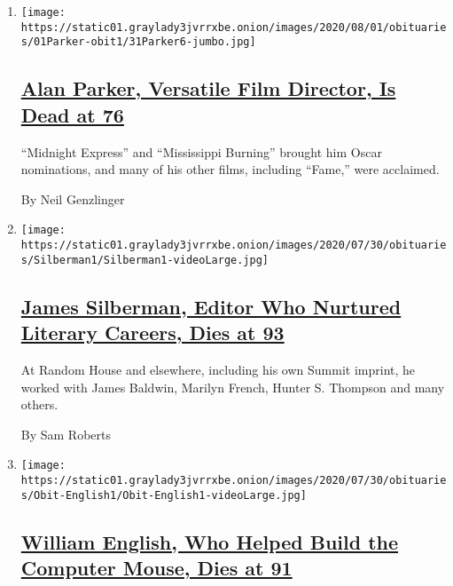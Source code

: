 \begin{enumerate}
\def\labelenumi{\arabic{enumi}.}
\item
  \texttt{[image: https://static01.graylady3jvrrxbe.onion/images/2020/08/01/obituaries/01Parker-obit1/31Parker6-jumbo.jpg]}

  \hypertarget{alan-parker-versatile-film-director-is-dead-at-76}{%
  \subsection{\texorpdfstring{\href{/2020/07/31/movies/alan-parker-versatile-film-director-is-dead-at-76.html}{Alan
  Parker, Versatile Film Director, Is Dead at
  76}}{Alan Parker, Versatile Film Director, Is Dead at 76}}\label{alan-parker-versatile-film-director-is-dead-at-76}}

  ``Midnight Express'' and ``Mississippi Burning'' brought him Oscar
  nominations, and many of his other films, including ``Fame,'' were
  acclaimed.

  By Neil Genzlinger
\item
  \texttt{[image: https://static01.graylady3jvrrxbe.onion/images/2020/07/30/obituaries/Silberman1/Silberman1-videoLarge.jpg]}

  \hypertarget{james-silberman-editor-who-nurtured-literary-careers-dies-at-93}{%
  \subsection{\texorpdfstring{\href{/2020/08/01/books/james-silberman-dead.html}{James
  Silberman, Editor Who Nurtured Literary Careers, Dies at
  93}}{James Silberman, Editor Who Nurtured Literary Careers, Dies at 93}}\label{james-silberman-editor-who-nurtured-literary-careers-dies-at-93}}

  At Random House and elsewhere, including his own Summit imprint, he
  worked with James Baldwin, Marilyn French, Hunter S. Thompson and many
  others.

  By Sam Roberts
\item
  \texttt{[image: https://static01.graylady3jvrrxbe.onion/images/2020/07/30/obituaries/Obit-English1/Obit-English1-videoLarge.jpg]}

  \hypertarget{william-english-who-helped-build-the-computer-mouse-dies-at-91}{%
  \subsection{\texorpdfstring{\href{/2020/07/31/technology/william-english-who-helped-build-the-computer-mouse-dies-at-91.html}{William
  English, Who Helped Build the Computer Mouse, Dies at
  91}}{William English, Who Helped Build the Computer Mouse, Dies at 91}}\label{william-english-who-helped-build-the-computer-mouse-dies-at-91}}


\end{enumerate}
